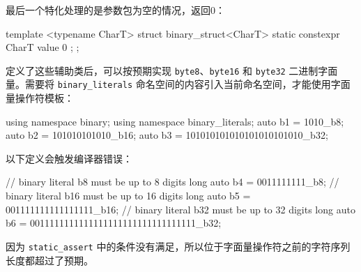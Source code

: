 最后一个特化处理的是参数包为空的情况，返回0：

\begin{cpp}
template <typename CharT>
struct binary_struct<CharT>
{
    static constexpr CharT value{ 0 };
};
\end{cpp}

定义了这些辅助类后，可以按预期实现 \verb|byte8|、\verb|byte16| 和 \verb|byte32| 二进制字面量。需要将 \verb|binary_literals| 命名空间的内容引入当前命名空间，才能使用字面量操作符模板：

\begin{cpp}
using namespace binary;
using namespace binary_literals;
auto b1 = 1010_b8;
auto b2 = 101010101010_b16;
auto b3 = 101010101010101010101010_b32;
\end{cpp}

以下定义会触发编译器错误：

\begin{cpp}
// binary literal b8 must be up to 8 digits long
auto b4 = 0011111111_b8;
// binary literal b16 must be up to 16 digits long
auto b5 = 001111111111111111_b16;
// binary literal b32 must be up to 32 digits long
auto b6 = 0011111111111111111111111111111111_b32;
\end{cpp}

因为 \verb|static_assert| 中的条件没有满足，所以位于字面量操作符之前的字符序列长度都超过了预期。











